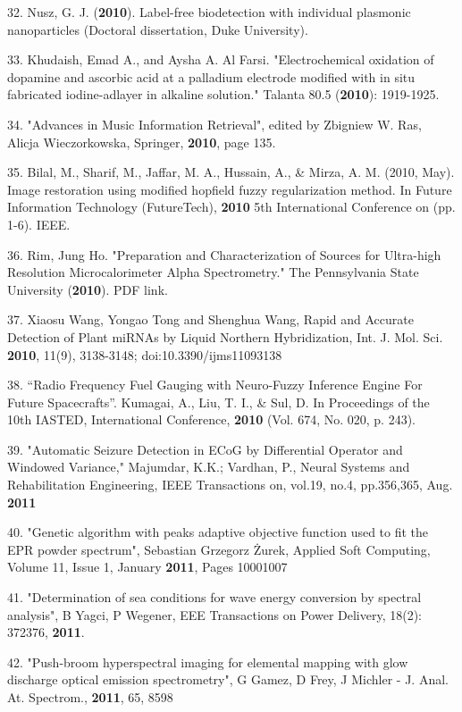 32. Nusz, G. J. (\textbf{2010}). Label-free biodetection with individual plasmonic nanoparticles (Doctoral dissertation, Duke University).

33. Khudaish, Emad A., and Aysha A. Al Farsi. "Electrochemical oxidation of dopamine and ascorbic acid at a palladium electrode modified with in situ fabricated iodine-adlayer in alkaline solution." Talanta 80.5 (\textbf{2010}): 1919-1925.

34. "Advances in Music Information Retrieval", edited by Zbigniew W. Ras, Alicja Wieczorkowska, Springer, \textbf{2010}, page 135.

35. Bilal, M., Sharif, M., Jaffar, M. A., Hussain, A., \& Mirza, A. M. (2010, May). Image restoration using modified hopfield fuzzy regularization method. In Future Information Technology (FutureTech), \textbf{2010} 5th International Conference on (pp. 1-6). IEEE.

36. Rim, Jung Ho. "Preparation and Characterization of Sources for Ultra-high Resolution Microcalorimeter Alpha Spectrometry." The Pennsylvania State University (\textbf{2010}). PDF link.

37. Xiaosu Wang, Yongao Tong and Shenghua Wang, Rapid and Accurate Detection of Plant miRNAs by Liquid Northern Hybridization, Int. J. Mol. Sci. \textbf{2010}, 11(9), 3138-3148; doi:10.3390/ijms11093138

38. ``Radio Frequency Fuel Gauging with Neuro-Fuzzy Inference Engine For Future Spacecrafts''. Kumagai, A., Liu, T. I., \& Sul, D. In Proceedings of the 10th IASTED, International Conference, \textbf{2010} (Vol. 674, No. 020, p. 243).

39. "Automatic Seizure Detection in ECoG by Differential Operator and Windowed Variance," Majumdar, K.K.; Vardhan, P., Neural Systems and Rehabilitation Engineering, IEEE Transactions on, vol.19, no.4, pp.356,365, Aug. \textbf{2011}

40. "Genetic algorithm with peaks adaptive objective function used to fit the EPR powder spectrum", Sebastian Grzegorz \.{Z}urek, Applied Soft Computing, Volume 11, Issue 1, January \textbf{2011}, Pages 1000\textendash{}1007

41. "Determination of sea conditions for wave energy conversion by spectral analysis", B Yagci, P Wegener, EEE Transactions on Power Delivery, 18(2): 372\textendash{}376, \textbf{2011}.

42. "Push-broom hyperspectral imaging for elemental mapping with glow discharge optical emission spectrometry", G Gamez, D Frey, J Michler - J. Anal. At. Spectrom., \textbf{2011}, 65, 85\textendash{}98

